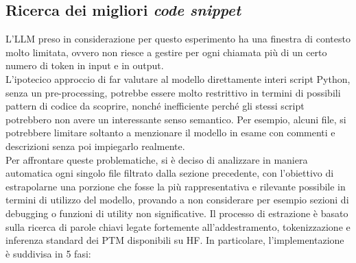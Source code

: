 \documentclass{article}
\begin{document}
\subsection{Ricerca dei migliori \textit{code snippet}}
L'LLM preso in considerazione per questo esperimento ha una finestra di contesto molto limitata, ovvero non riesce a gestire per ogni chiamata più di un certo numero di token in input e in output.\\
L'ipotecico approccio di far valutare al modello direttamente interi script Python, senza un pre-processing, potrebbe essere molto restrittivo in termini di possibili pattern di codice da scoprire, nonché inefficiente perché gli stessi script potrebbero non avere un interessante senso semantico. Per esempio, alcuni file, si potrebbere limitare soltanto a menzionare il modello in esame con commenti e descrizioni senza poi impiegarlo realmente.\\
Per affrontare queste problematiche, si è deciso di analizzare in maniera automatica ogni singolo file filtrato dalla sezione precedente, con l'obiettivo di estrapolarne una porzione che fosse la più rappresentativa e rilevante possibile in termini di utilizzo del modello, provando a non considerare per esempio sezioni di debugging o funzioni di utility non significative. Il processo di estrazione è basato sulla ricerca di parole chiavi legate fortemente all'addestramento, tokenizzazione e inferenza standard dei PTM disponibili su HF. In particolare, l'implementazione è suddivisa in 5 fasi:\\
\end{document}
